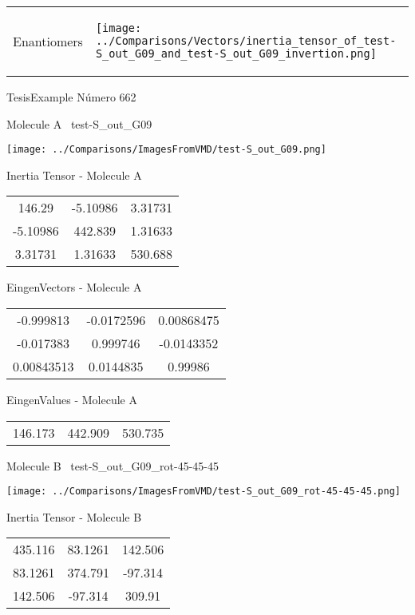 \vtab[-5mm]
\begin{tabular}{*{2}{m{}}}
\begin{center}
\textcolor{NavyBlue}{\Large Enantiomers}
\end{center}
&
\begin{center}
\texttt{[image: ../Comparisons/Vectors/inertia\_tensor\_of\_test-S\_out\_G09\_and\_test-S\_out\_G09\_invertion.png]}
\end{center}
\end{tabular}

 \newpage

\vtab[-3cm]
\begin{center}
{\large TesisExample \tab Número 662}
\end{center}
\begin{multicols}{2}
\begin{center}

Molecule A \
test-S\_out\_G09

\texttt{[image: ../Comparisons/ImagesFromVMD/test-S\_out\_G09.png]}

Inertia Tensor - Molecule A \\
\begin{tabular}{|c c c|}
146.29	 & 	-5.10986	 & 	3.31731	 \\
-5.10986	 & 	442.839	 & 	1.31633	 \\
3.31731	 & 	1.31633	 & 	530.688
\end{tabular}

\vtab
 EingenVectors - Molecule A     \\
\begin{tabular}{|c c c|}
-0.999813	 & 	-0.0172596	 & 	0.00868475	 \\
-0.017383	 & 	0.999746	 & 	-0.0143352	 \\
0.00843513	 & 	0.0144835	 & 	0.99986
\end{tabular}

\vtab
 EingenValues - Molecule A     \\
\begin{tabular}{|c c c|}
146.173	 & 	442.909	 & 	530.735	 \\
\end{tabular}
\columnbreak

Molecule B \
test-S\_out\_G09\_rot-45-45-45

\texttt{[image: ../Comparisons/ImagesFromVMD/test-S\_out\_G09\_rot-45-45-45.png]}

Inertia Tensor - Molecule B \\
\begin{tabular}{|c c c|}
435.116	 & 	83.1261	 & 	142.506	 \\
83.1261	 & 	374.791	 & 	-97.314	 \\
142.506	 & 	-97.314	 & 	309.91
\end{tabular}


\end{center}
\end{multicols}
